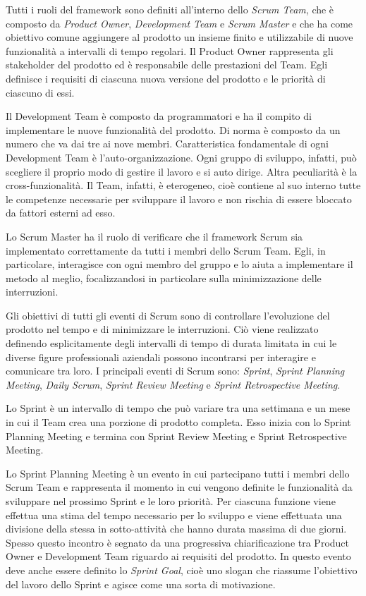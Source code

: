 			Tutti i ruoli del framework sono definiti all'interno dello \emph{Scrum Team}, che è composto da \emph{Product Owner}, \emph{Development Team} e \emph{Scrum Master} e che ha come obiettivo comune aggiungere al prodotto un insieme finito e utilizzabile di nuove funzionalità a intervalli di tempo regolari.
			Il Product Owner rappresenta gli stakeholder del prodotto ed è responsabile delle prestazioni del Team.
			Egli definisce i requisiti di ciascuna nuova versione del prodotto e le priorità di ciascuno di essi.
			
			Il Development Team è composto da programmatori e ha il compito di implementare le nuove funzionalità del prodotto.
			Di norma è composto da un numero che va dai tre ai nove membri.
			Caratteristica fondamentale di ogni Development Team è l'auto-organizzazione. 
			Ogni gruppo di sviluppo, infatti, può scegliere il proprio modo di gestire il lavoro e si auto dirige.
			Altra peculiarità è la cross-funzionalità.
			Il Team, infatti, è eterogeneo, cioè contiene al suo interno tutte le competenze necessarie per sviluppare il lavoro e non rischia di essere bloccato da fattori esterni ad esso. 
			
			Lo Scrum Master ha il ruolo di verificare che il framework Scrum sia implementato correttamente da tutti i membri dello Scrum Team.
			Egli, in particolare, interagisce con ogni membro del gruppo e lo aiuta a implementare il metodo al meglio, focalizzandosi in particolare sulla minimizzazione delle interruzioni.

			Gli obiettivi di tutti gli eventi di Scrum sono di controllare l'evoluzione del prodotto nel tempo e di minimizzare le interruzioni. 
			Ciò viene realizzato definendo esplicitamente degli intervalli di tempo di durata limitata in cui le diverse figure professionali aziendali possono incontrarsi per interagire e comunicare tra loro.
			I principali eventi di Scrum sono: \emph{Sprint}, \emph{Sprint Planning Meeting}, \emph{Daily Scrum}, \emph{Sprint Review Meeting} e \emph{Sprint Retrospective Meeting}.

			Lo Sprint è un intervallo di tempo che può variare tra una settimana e un mese in cui il Team crea una porzione di prodotto completa. 
			Esso inizia con lo Sprint Planning Meeting e termina con Sprint Review Meeting e Sprint Retrospective Meeting.
			
			Lo Sprint Planning Meeting è un evento in cui partecipano tutti i membri dello Scrum Team e rappresenta il momento in cui vengono definite le funzionalità da sviluppare nel prossimo Sprint e le loro priorità.
			Per ciascuna funzione viene effettua una stima del tempo necessario per lo sviluppo e viene effettuata una divisione della stessa in sotto-attività che hanno durata massima di due giorni.
			Spesso questo incontro è segnato da una progressiva chiarificazione tra Product Owner e Development Team riguardo ai requisiti del prodotto. 
			In questo evento deve anche essere definito lo \emph{Sprint Goal}, cioè uno slogan che riassume l'obiettivo del lavoro dello Sprint e agisce come una sorta di motivazione.
		
